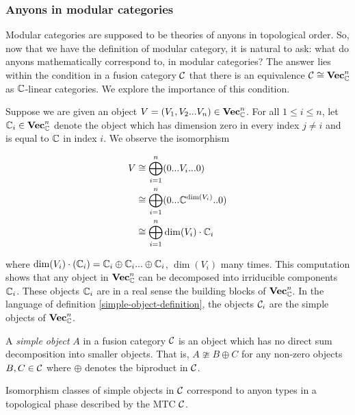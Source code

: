 \subsubsection{Anyons in modular categories}

Modular categories are supposed to be theories of anyons in topological order. So, now that we have the definition of modular category, it is natural to ask: what do anyons mathematically correspond to, in modular categories? The answer lies within the condition in a fusion category ${\mathcal C}$ that there is an equivalence ${\mathcal C}\cong {\bf Vec}_{\mathbb C}^n$ as ${\mathbb C}$-linear categories. We explore the importance of this condition.

\begin{rem}
Suppose we are given an object $V=(V_1,V_2...V_n)\in {\bf Vec}_{\mathbb C}^n$. For all $1\leq i\leq n$, let  ${\mathbb C}_i\in {\bf Vec}_{\mathbb C}^n$ denote the object which has dimension zero in every index $j\neq i$ and is equal to ${\mathbb C}$ in index $i$. We observe the isomorphism

\begin{align*}
V& \cong \bigoplus_{i=1}^n (0... V_i ... 0)\\
& \cong \bigoplus_{i=1}^n (0... {\mathbb C}^{\dim (V_i)}.. 0)\\
& \cong \bigoplus_{i=1}^n \dim(V_i)\cdot {\mathbb C}_i
\end{align*}

where $\dim(V_i)\cdot ({\mathbb C}_i)={\mathbb C}_i\oplus {\mathbb C}_i...\oplus {\mathbb C}_i$, $\dim(V_i)$ many times. This computation shows that any object in ${\bf Vec}_{\mathbb C}^n$ can be decomposed into irriducible components ${\mathbb C}_i$. These objects ${\mathbb C}_i$ are in a real sense the building blocks of ${\bf Vec}_{\mathbb C}^n$. In the language of definition \ref{simple-object-definition}, the objects ${\mathcal C}_i$ are the simple objects of ${\bf Vec}_{{\mathbb C}}^n$.
\end{rem}

\begin{defn}\label{simple-object-definition} A \textit{simple object} $A$ in a fusion category ${\mathcal C}$ is an object which has no direct sum decomposition into smaller objects. That is, $A\ncong B\oplus C$ for any non-zero objects $B,C\in {\mathcal C}$ where $\oplus$ denotes the biproduct in ${\mathcal C}$.
\end{defn}

\begin{dict}\label{anyon-types-definition}
Isomorphism classes of simple objects in ${\mathcal C}$ correspond to anyon types in a topological phase described by the MTC ${\mathcal C}$.
\end{dict}

